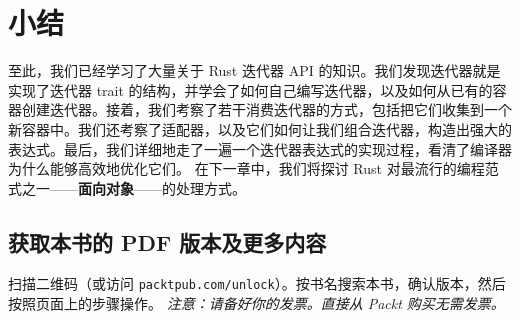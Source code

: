 \section{小结}
至此，我们已经学习了大量关于 Rust 迭代器 API 的知识。我们发现迭代器就是实现了迭代器 trait 的结构，并学会了如何自己编写迭代器，以及如何从已有的容器创建迭代器。接着，我们考察了若干消费迭代器的方式，包括把它们收集到一个新容器中。我们还考察了适配器，以及它们如何让我们组合迭代器，构造出强大的表达式。最后，我们详细地走了一遍一个迭代器表达式的实现过程，看清了编译器为什么能够高效地优化它们。
在下一章中，我们将探讨 Rust 对最流行的编程范式之一——\textbf{面向对象}——的处理方式。
\begin{samepage}
\subsection{获取本书的 PDF 版本及更多内容}
扫描二维码（或访问 \texttt{packtpub.\allowbreak{}com/\allowbreak{}unlock}）。按书名搜索本书，确认版本，然后按照页面上的步骤操作。
\emph{注意：请备好你的发票。直接从 Packt 购买无需发票。}
\end{samepage}
